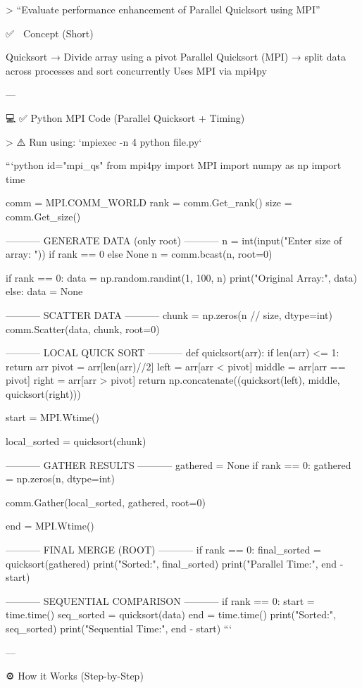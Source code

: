 
> “Evaluate performance enhancement of Parallel Quicksort using MPI”


 ✅ 🧠 Concept (Short)

 Quicksort → Divide array using a pivot
 Parallel Quicksort (MPI) → split data across processes and sort concurrently
 Uses MPI via mpi4py

---

 💻 ✅ Python MPI Code (Parallel Quicksort + Timing)

> ⚠️ Run using: `mpiexec -n 4 python file.py`

```python id="mpi_qs"
from mpi4py import MPI
import numpy as np
import time

comm = MPI.COMM_WORLD
rank = comm.Get_rank()
size = comm.Get_size()

 ----------- GENERATE DATA (only root) -----------
n = int(input("Enter size of array: ")) if rank == 0 else None
n = comm.bcast(n, root=0)

if rank == 0:
    data = np.random.randint(1, 100, n)
    print("Original Array:", data)
else:
    data = None

 ----------- SCATTER DATA -----------
chunk = np.zeros(n // size, dtype=int)
comm.Scatter(data, chunk, root=0)

 ----------- LOCAL QUICK SORT -----------
def quicksort(arr):
    if len(arr) <= 1:
        return arr
    pivot = arr[len(arr)//2]
    left = arr[arr < pivot]
    middle = arr[arr == pivot]
    right = arr[arr > pivot]
    return np.concatenate((quicksort(left), middle, quicksort(right)))

start = MPI.Wtime()

local_sorted = quicksort(chunk)

 ----------- GATHER RESULTS -----------
gathered = None
if rank == 0:
    gathered = np.zeros(n, dtype=int)

comm.Gather(local_sorted, gathered, root=0)

end = MPI.Wtime()

 ----------- FINAL MERGE (ROOT) -----------
if rank == 0:
    final_sorted = quicksort(gathered)
    print("\nParallel Sorted:", final_sorted)
    print("Parallel Time:", end - start)


 ----------- SEQUENTIAL COMPARISON -----------
if rank == 0:
    start = time.time()
    seq_sorted = quicksort(data)
    end = time.time()
    print("\nSequential Sorted:", seq_sorted)
    print("Sequential Time:", end - start)
```

---

 ⚙️ How it Works (Step-by-Step)


